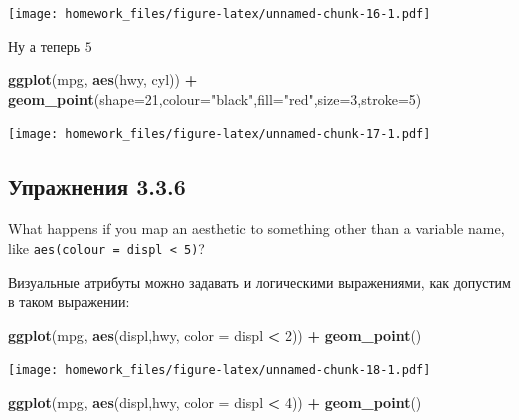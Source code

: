 \documentclass[]{book}
\newenvironment{Shaded}{\begin{snugshade}}{\end{snugshade}}
\newcommand{\KeywordTok}[1]{\textcolor[rgb]{0.13,0.29,0.53}{\textbf{#1}}}
\newcommand{\DataTypeTok}[1]{\textcolor[rgb]{0.13,0.29,0.53}{#1}}
\newcommand{\DecValTok}[1]{\textcolor[rgb]{0.00,0.00,0.81}{#1}}
\newcommand{\StringTok}[1]{\textcolor[rgb]{0.31,0.60,0.02}{#1}}
\newcommand{\OperatorTok}[1]{\textcolor[rgb]{0.81,0.36,0.00}{\textbf{#1}}}
\newcommand{\NormalTok}[1]{#1}
\begin{document}
\texttt{[image: homework\_files/figure-latex/unnamed-chunk-16-1.pdf]}

Ну а теперь \(5\)

\begin{Shaded}
\begin{Highlighting}[]
\KeywordTok{ggplot}\NormalTok{(mpg, }\KeywordTok{aes}\NormalTok{(hwy, cyl)) }\OperatorTok{+}
\StringTok{ }\KeywordTok{geom_point}\NormalTok{(}\DataTypeTok{shape=}\DecValTok{21}\NormalTok{,}\DataTypeTok{colour=}\StringTok{"black"}\NormalTok{,}\DataTypeTok{fill=}\StringTok{"red"}\NormalTok{,}\DataTypeTok{size=}\DecValTok{3}\NormalTok{,}\DataTypeTok{stroke=}\DecValTok{5}\NormalTok{)}
\end{Highlighting}
\end{Shaded}

\texttt{[image: homework\_files/figure-latex/unnamed-chunk-17-1.pdf]}

\subsection*{Упражнения 3.3.6}\label{-3.3.6}

What happens if you map an aesthetic to something other than a variable
name, like \texttt{aes(colour\ =\ displ\ \textless{}\ 5)}?

Визуальные атрибуты можно задавать и логическими выражениями, как
допустим в таком выражении:

\begin{Shaded}
\begin{Highlighting}[]
 \KeywordTok{ggplot}\NormalTok{(mpg, }\KeywordTok{aes}\NormalTok{(displ,hwy, }\DataTypeTok{color =}\NormalTok{ displ }\OperatorTok{<}\StringTok{ }\DecValTok{2}\NormalTok{)) }\OperatorTok{+}
\StringTok{   }\KeywordTok{geom_point}\NormalTok{()}
\end{Highlighting}
\end{Shaded}

\texttt{[image: homework\_files/figure-latex/unnamed-chunk-18-1.pdf]}

\begin{Shaded}
\begin{Highlighting}[]
 \KeywordTok{ggplot}\NormalTok{(mpg, }\KeywordTok{aes}\NormalTok{(displ,hwy, }\DataTypeTok{color =}\NormalTok{ displ }\OperatorTok{<}\StringTok{ }\DecValTok{4}\NormalTok{)) }\OperatorTok{+}
\StringTok{   }\KeywordTok{geom_point}\NormalTok{()}
\end{Highlighting}
\end{Shaded}
\end{document}

